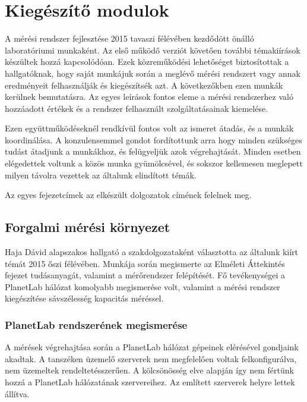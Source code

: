 \chapter{Kiegészítő modulok}


A mérési rendszer fejlesztése 2015 tavaszi félévében kezdődött önálló laboratóriumi munkaként. Az első működő verziót követően további témakiírások készültek hozzá kapcsolódóan. Ezek közreműködési lehetőséget biztosítottak a hallgatóknak, hogy saját munkájuk során a meglévő mérési rendszert vagy annak eredményeit felhasználják és kiegészítsék azt. A következőkben ezen munkák kerülnek bemutatásra. Az egyes leírások fontos eleme a mérési rendszerhez való hozzáadott értékek és a rendszer felhasznált szolgáltatásainak kiemelése.

Ezen együttműködéseknél rendkívül fontos volt az ismeret átadás, és a munkák koordinálása. A konzulensemmel gondot fordítottunk arra hogy minden szükséges tudást átadjunk a munkákhoz, és felügyeljük azok végrehajtását. Minden esetben elégedettek voltunk a közös munka gyümölcsével, és sokszor kellemesen meglepett milyen távolra vezettek az általunk elindított témák.

Az egyes fejezetcímek az elkészült dolgozatok címének felelnek meg.


\section{Forgalmi mérési környezet}


Haja Dávid alapszakos hallgató a szakdolgozataként választotta az általunk kiírt témát 2015 őszi félévében. Munkája során megismerte az Elméleti Áttekintés fejezet tudásanyagát, valamint a mérőrendszer felépítését. Fő tevékenységei a PlanetLab hálózat komolyabb megismerése volt, valamint a mérési rendszer kiegészítése sávszélesség kapacitás méréssel.

\subsection*{PlanetLab rendszerének megismerése}
A mérések végrehajtása során a PlanetLab hálózat gépeinek elérésével gondjaink akadtak. A tanszéken üzemelő szerverek nem megfelelően voltak felkonfigurálva, nem üzemeltek rendeltetésszerűen. A kölcsönösség elve alapján így nem fértünk hozzá a PlanetLab hálózatának szervereihez. Az említett szerverek helyre lettek állítva. 


